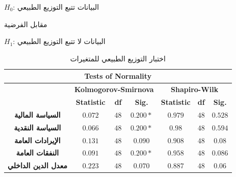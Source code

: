 \documentclass[10pt,a4paper]{report}
\begin{document}
\begin{doublespacing}
$H_0$: البيانات تتبع التوزيع الطبيعي

مقابل الفرضية

$H_1$: البيانات لا تتبع التوزيع الطبيعي

\begin{table}[H]
	\captionsetup{font=Large}  %
	\fontsize{12}{12}\selectfont
	\centering
	\caption{اختبار التوزيع الطبيعي للمتغيرات}
	\label{tab:12.3}
		\begin{tabular}{@{}|ccccccc|@{}}
			\toprule
			\multicolumn{7}{|c|}{\textenglish{Tests of Normality}} \\ \midrule
			\multicolumn{1}{|c|}{\multirow{2}{*}{}} &
			\multicolumn{3}{c|}{\textbf{\textenglish{Kolmogorov-Smirnova}}} &
			\multicolumn{3}{c|}{\textbf{\textenglish{Shapiro-Wilk}}} \\ \cmidrule(l){2-7} 
			\multicolumn{1}{|c|}{} &
			\multicolumn{1}{c|}{\textbf{Statistic}} &
			\multicolumn{1}{c|}{\textbf{df}} &
			\multicolumn{1}{c|}{\textbf{\textenglish{Sig.}}} &
			\multicolumn{1}{c|}{\textbf{Statistic}} &
			\multicolumn{1}{c|}{\textbf{df}} &
			\textbf{\textenglish{Sig.}} \\ \midrule
			\multicolumn{1}{|c|}{\textbf{السياسة المالية}} &
			\multicolumn{1}{c|}{$0.072$} &
			\multicolumn{1}{c|}{$48$} &
			\multicolumn{1}{c|}{$0.200*$} &
			\multicolumn{1}{c|}{$0.979$} &
			\multicolumn{1}{c|}{$48$} &
			$0.528$ \\ \midrule
			\multicolumn{1}{|c|}{\textbf{السياسة النقدية}} &
			\multicolumn{1}{c|}{$0.066$} &
			\multicolumn{1}{c|}{$48$} &
			\multicolumn{1}{c|}{$0.200*$} &
			\multicolumn{1}{c|}{$0.98$} &
			\multicolumn{1}{c|}{$48$} &
			$0.594$ \\ \midrule
			\multicolumn{1}{|c|}{\textbf{الإيرادات العامة}} &
			\multicolumn{1}{c|}{$0.131$} &
			\multicolumn{1}{c|}{$48$} &
			\multicolumn{1}{c|}{$0.090$} &
			\multicolumn{1}{c|}{$0.908$} &
			\multicolumn{1}{c|}{$48$} &
			$0.08$ \\ \midrule
			\multicolumn{1}{|c|}{\textbf{النفقات العامة}} &
			\multicolumn{1}{c|}{$0.091$} &
			\multicolumn{1}{c|}{$48$} &
			\multicolumn{1}{c|}{$0.200*$} &
			\multicolumn{1}{c|}{$0.958$} &
			\multicolumn{1}{c|}{$48$} &
			$0.086$ \\ \midrule
			\multicolumn{1}{|c|}{\textbf{معدل الدين الداخلي}} &
			\multicolumn{1}{c|}{$0.223$} &
			\multicolumn{1}{c|}{$48$} &
			\multicolumn{1}{c|}{$0.070$} &
			\multicolumn{1}{c|}{$0.887$} &
			\multicolumn{1}{c|}{$48$} &
			$0.06$ \\ \midrule

\end{tabular}
\end{table}
\end{doublespacing}
\end{document}
